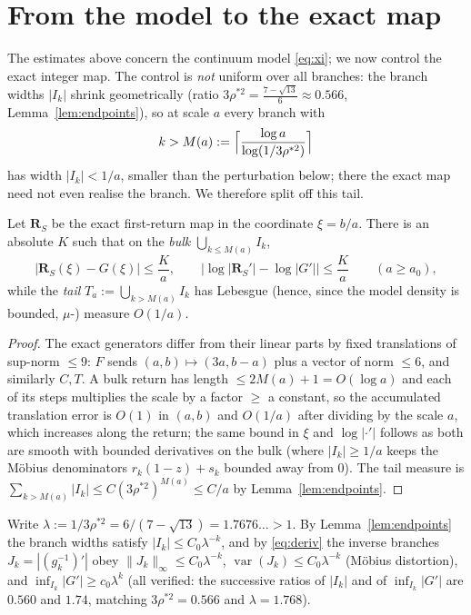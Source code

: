 \documentclass[11pt]{article}
\theoremstyle{definition}\newtheorem{definition}{Definition}
\theoremstyle{remark}\newtheorem{remark}{Remark}
\newcommand{\R}{\mathbf{R}}\newcommand{\Z}{\mathbb{Z}}\newcommand{\N}{\mathbb{N}}
\DeclareMathOperator{\var}{var}
\begin{document}
\section{From the model to the exact map}\label{sec:exact}
The estimates above concern the continuum model \eqref{eq:xi}; we now control
the exact integer map. The control is \emph{not} uniform over all branches:
the branch widths $|I_k|$ shrink geometrically (ratio
$3\rho^{\ast2}=\tfrac{7-\sqrt{13}}{6}\approx0.566$, Lemma~\ref{lem:endpoints}),
so at scale $a$ every branch with
\begin{equation}\label{eq:Ma}
k>M(a):=\Bigl\lceil\frac{\log a}{\log(1/3\rho^{\ast2})}\Bigr\rceil
\end{equation}
has width $|I_k|<1/a$, smaller than the perturbation below; there the exact
map need not even realise the branch. We therefore split off this tail.

\begin{lemma}\label{lem:close}
Let $\R_S$ be the exact first-return map in the coordinate $\xi=b/a$. There
is an absolute $K$ such that on the \emph{bulk} $\bigcup_{k\le M(a)}I_k$,
\[
\bigl|\R_S(\xi)-G(\xi)\bigr|\le \frac{K}{a},\qquad
\bigl|\log|\R_S'|-\log|G'|\bigr|\le \frac{K}{a}\qquad(a\ge a_0),
\]
while the \emph{tail} $T_a:=\bigcup_{k>M(a)}I_k$ has Lebesgue (hence, since
the model density is bounded, $\mu$-) measure $O(1/a)$.
\end{lemma}
\begin{proof}
The exact generators differ from their linear parts by fixed translations
of sup-norm $\le9$: $F$ sends $(a,b)\mapsto(3a,b-a)$ plus a vector of norm
$\le6$, and similarly $C,T$. A bulk return has length $\le2M(a)+1=O(\log a)$
and each of its steps multiplies the scale by a factor $\ge$ a constant, so
the accumulated translation error is $O(1)$ in $(a,b)$ and $O(1/a)$ after
dividing by the scale $a$, which increases along the return; the same bound
in $\xi$ and $\log|\cdot'|$ follows as both are smooth with bounded
derivatives on the bulk (where $|I_k|\ge1/a$ keeps the M\"obius denominators
$r_k(1-z)+s_k$ bounded away from $0$). The tail measure is
$\sum_{k>M(a)}|I_k|\le C(3\rho^{\ast2})^{M(a)}\le C/a$ by
Lemma~\ref{lem:endpoints}.
\end{proof}

Write $\lambda:=1/3\rho^{\ast2}=6/(7-\sqrt{13})=1.7676\ldots>1$. By
Lemma~\ref{lem:endpoints} the branch widths satisfy $|I_k|\le C_0\lambda^{-k}$,
and by \eqref{eq:deriv} the inverse branches $J_k=|(g_k^{-1})'|$ obey
$\|J_k\|_\infty\le C_0\lambda^{-k}$, $\var(J_k)\le C_0\lambda^{-k}$ (M\"obius
distortion), and $\inf_{I_k}|G'|\ge c_0\lambda^{k}$ (all verified: the
successive ratios of $|I_k|$ and of $\inf_{I_k}|G'|$ are $0.560$ and $1.74$,
matching $3\rho^{\ast2}=0.566$ and $\lambda=1.768$).
\end{document}
